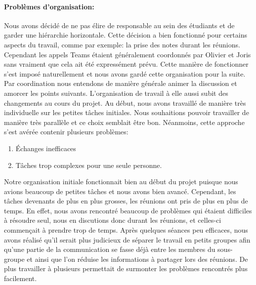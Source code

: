 \paragraph{Problèmes d'organisation:} Nous avons décidé de ne pas élire de responsable au sein des étudiants et de garder une hiérarchie horizontale. Cette décision a bien fonctionné pour certains aspects du travail, comme par exemple: la prise des notes durant les réunions.
Cependant les appels Teams étaient généralement coordonnés par Olivier et Joris sans vraiment que cela ait été expressément prévu. Cette manière de fonctionner s'est imposé naturellement et nous avons gardé cette organisation pour la suite. Par coordination nous entendons de manière générale animer la discussion et amorcer les points suivants. 
L'organisation de travail à elle aussi subit des changements au cours du projet. Au début, nous avons travaillé de manière très individuelle sur les petites tâches initiales. Nous souhaitions pouvoir travailler de manière très parallèle et ce choix semblait être bon.
Néanmoins, cette approche s'est avérée contenir plusieurs problèmes:
\begin{enumerate}
    \item Échanges inefficaces \label{item:friction}
    \item Tâches trop complexes pour une seule personne. \label{item:complex}
\end{enumerate}
Notre organisation initiale fonctionnait bien au début du projet puisque nous avions beaucoup de petites tâches et nous avons bien avancé. 
Cependant, les tâches devenants de plus en plus grosses, les réunions ont pris de plus en plus de temps. 
En effet, nous avons rencontré beaucoup de problèmes qui étaient difficiles à résoudre seul, nous en discutions donc durant les réunions, et celles-ci commençait à prendre trop de temps.
Après quelques séances peu efficaces, nous avons réalisé qu'il serait plus judicieux de séparer le travail en petits groupes afin qu'une partie de la communication se fasse déjà entre les membres du sous-groupe et ainsi que l'on réduise les informations à partager lors des réunions. De plus travailler à plusieurs permettait de surmonter les problèmes rencontrés plus facilement.
\paragraph{}

